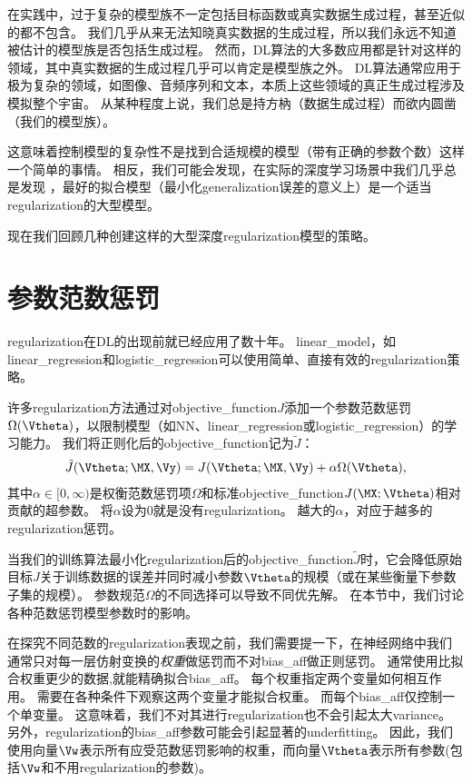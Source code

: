 在实践中，过于复杂的模型族不一定包括目标函数或真实数据生成过程，甚至近似的都不包含。
我们几乎从来无法知晓真实数据的生成过程，所以我们永远不知道被估计的模型族是否包括生成过程。
然而，\gls{DL}算法的大多数应用都是针对这样的领域，其中真实数据的生成过程几乎可以肯定是模型族之外。
\gls{DL}算法通常应用于极为复杂的领域，如图像、音频序列和文本，本质上这些领域的真正生成过程涉及模拟整个宇宙。
从某种程度上说，我们总是持方枘（数据生成过程）而欲内圆凿（我们的模型族）。

这意味着控制模型的复杂性不是找到合适规模的模型（带有正确的参数个数）这样一个简单的事情。
相反，我们可能会发现，在实际的深度学习场景中我们几乎总是发现
，最好的拟合模型（最小化\gls{generalization}误差的意义上）是一个适当\gls{regularization}的大型模型。

现在我们回顾几种创建这样的大型深度\gls{regularization}模型的策略。


\section{参数范数惩罚}
\label{sec:parameter_norm_penalties}
\gls{regularization}在\gls{DL}的出现前就已经应用了数十年。
\gls{linear_model}，如\gls{linear_regression}和\gls{logistic_regression}可以使用简单、直接有效的\gls{regularization}策略。

许多\gls{regularization}方法通过对\gls{objective_function}$J$添加一个参数范数惩罚$\Omega(\Vtheta)$，以限制模型（如\gls{NN}、\gls{linear_regression}或\gls{logistic_regression}）的学习能力。
我们将正则化后的\gls{objective_function}记为$\tilde{J}$：
\begin{align}
 \tilde{J}(\Vtheta;\MX, \Vy) = J(\Vtheta;\MX, \Vy) + \alpha \Omega(\Vtheta),
\end{align}
其中$\alpha \in [0, \infty)$是权衡范数惩罚项$\Omega$和标准\gls{objective_function}$J(\MX;\Vtheta)$相对贡献的超参数。
将$\alpha$设为0就是没有\gls{regularization}。
越大的$\alpha$，对应于越多的\gls{regularization}惩罚。

当我们的训练算法最小化\gls{regularization}后的\gls{objective_function}$\tilde{J}$时，它会降低原始目标$J$关于训练数据的误差并同时减小参数$\Vtheta$的规模（或在某些衡量下参数子集的规模）。
参数规范$\Omega$的不同选择可以导致不同优先解。
在本节中，我们讨论各种范数惩罚模型参数时的影响。

在探究不同范数的\gls{regularization}表现之前，我们需要提一下，在神经网络中我们通常只对每一层仿射变换的\emph{权重}做惩罚而不对\gls{bias_aff}做正则惩罚。
通常使用比拟合权重更少的数据,就能精确拟合\gls{bias_aff}。
每个权重指定两个变量如何相互作用。
需要在各种条件下观察这两个变量才能拟合权重。
而每个\gls{bias_aff}仅控制一个单变量。
这意味着，我们不对其进行\gls{regularization}也不会引起太大\gls{variance}。
另外，\gls{regularization}的\gls{bias_aff}参数可能会引起显著的\gls{underfitting}。
因此，我们使用向量$\Vw$表示所有应受范数惩罚影响的权重，而向量$\Vtheta$表示所有参数(包括$\Vw$和不用\gls{regularization}的参数)。


